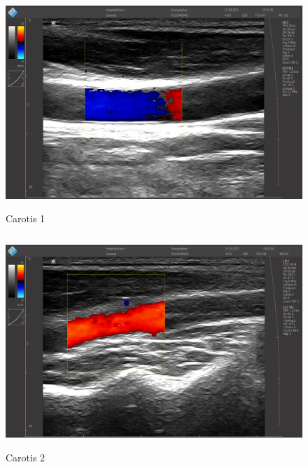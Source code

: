 \documentclass[11pt]{scrartcl}
\begin{document}
    \begin{figure}[H]
        \centering
        \includegraphics[height=8cm]{images/E1_e}
        \caption{Carotis 1}
        \label{fig:carotis1}
    \end{figure}

    \begin{figure}[H]
        \centering
        \includegraphics[height=8cm]{images/E2_e}
        \caption{Carotis 2}
        \label{fig:carotis2}
    \end{figure}
\end{document}

